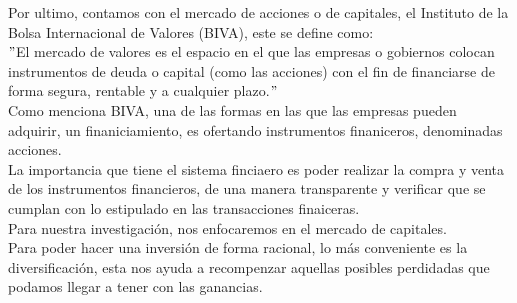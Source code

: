 \documentclass[12pt,a4paper]{article}
\begin{document}
	Por ultimo, contamos con el mercado de acciones o de capitales, el Instituto de la Bolsa Internacional de Valores (BIVA), este se define como:\\
	\hfill\break
	$"$El mercado de valores es el espacio en el que las empresas o gobiernos colocan instrumentos de deuda o capital (como las acciones) con el fin de financiarse de forma  segura, rentable y a cualquier plazo.$"$\\
	\hfill\break
	Como menciona BIVA, una de las formas en las que las empresas pueden adquirir, un finaniciamiento, es ofertando instrumentos finaniceros, denominadas acciones.\\
	La importancia que tiene el sistema finciaero es poder realizar la compra y venta de los instrumentos financieros, de una manera transparente  y verificar que se cumplan con lo estipulado en las transacciones finaiceras.\\
	
    Para nuestra investigación, nos enfocaremos en el mercado de capitales.\\
    Para poder hacer una inversión de forma racional, lo más conveniente es la diversificación, esta nos ayuda  a recompenzar aquellas posibles perdidadas que podamos  llegar a tener con las ganancias.\\
    
\end{document}
